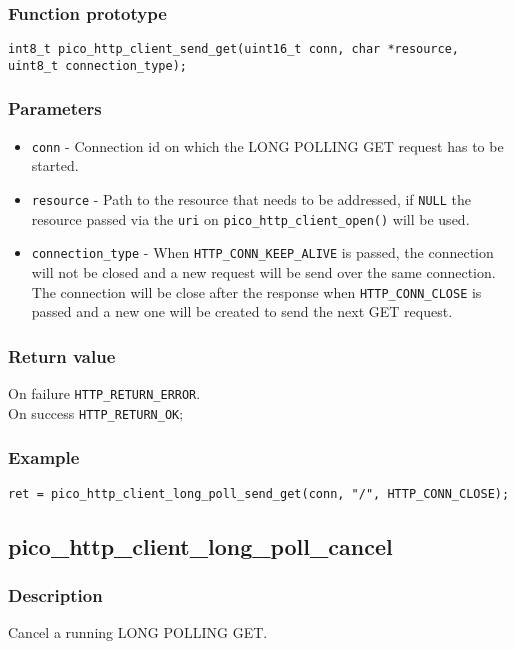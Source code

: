 \subsubsection*{Function prototype}
\texttt{int8\_t pico\_http\_client\_send\_get(uint16\_t conn, char *resource, uint8\_t connection\_type);}

\subsubsection*{Parameters}

\begin{itemize}[noitemsep]
\item \texttt{conn} - Connection id on which the LONG POLLING GET request has to be started.
\item \texttt{resource} - Path to the resource that needs to be addressed, if \texttt{NULL} the resource passed via the \texttt{uri} on \texttt{pico\_http\_client\_open()} will be used.
\item \texttt{connection\_type} - When \texttt{HTTP\_CONN\_KEEP\_ALIVE} is passed, the connection will not be closed and a new request will be send over the same connection. The connection will be close after the response when \texttt{HTTP\_CONN\_CLOSE} is passed and a new one will be created to send the next GET request.
\end{itemize}
\subsubsection*{Return value}
On failure \texttt{HTTP\_RETURN\_ERROR}.
\\On success \texttt{HTTP\_RETURN\_OK};
\subsubsection*{Example}
\begin{verbatim}
ret = pico_http_client_long_poll_send_get(conn, "/", HTTP_CONN_CLOSE);
\end{verbatim}


\subsection{pico\_http\_client\_long\_poll\_cancel}

\subsubsection*{Description}
Cancel a running LONG POLLING GET.

